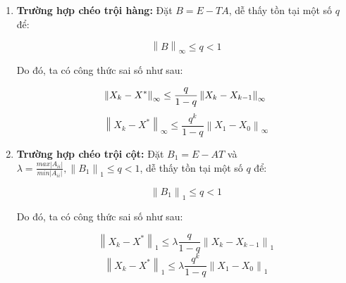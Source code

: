     \begin{enumerate}[label = (\roman*)]
        \item \textbf{Trường hợp chéo trội hàng:} Đặt $B = E - TA$, dễ thấy tồn tại một số $q$ để:
        
        $$ \left\lVert B\right\rVert _{\infty} \leq q < 1 $$ 
        
        Do đó, ta có công thức sai số như sau:
        
        \begin{equation}
            \left\lVert X_{k} - X^{*} \right\rVert_{\infty} \leq \frac{q}{1 - q} \left\lVert X_{k} - X_{k - 1} \right\rVert_{\infty} \\
        \end{equation}
        \begin{equation}
            \left\lVert X_{k} - X^{*} \right\rVert_{\infty} \leq \frac{q^{k}}{1 - q} \left\lVert X_{1} - X_{0} \right\rVert_{\infty}
        \end{equation}


        \item \textbf{Trường hợp chéo trội cột:} Đặt $B_{1} = E - AT$ và $\lambda = \frac{max \left\lvert A_{ii}\right\rvert }{min \left\lvert A_{ii}\right\rvert }, \left\lVert B_{1}\right\rVert _{1} \leq q < 1 $, dễ thấy tồn tại một số $q$ để:
        
        $$ \left\lVert B_{1} \right\rVert _{1} \leq q < 1 $$ 
        
        Do đó, ta có công thức sai số như sau:
        
        \begin{equation}
            \left\lVert X_{k} - X^{*} \right\rVert_{1} \leq \lambda \frac{q}{1 - q} \left\lVert X_{k} - X_{k - 1} \right\rVert_{1}
        \end{equation}
        \begin{equation}
            \left\lVert X_{k} - X^{*} \right\rVert_{1} \leq \lambda \frac{q^{k}}{1 - q} \left\lVert X_{1} - X_{0} \right\rVert_{1}
        \end{equation}

    \end{enumerate}

